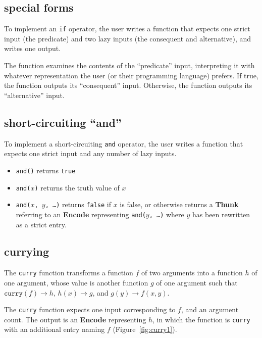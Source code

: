 \documentclass{article}
\newcommand{\encode}{\textbf{Encode}\xspace}
\newcommand{\thunk}{\textbf{Thunk}\xspace}
\newcommand{\bs}{\vspace{\baselineskip}}
\begin{document}
\subsection{special forms} To implement an \texttt{if}
operator, the user writes a function that expects one strict input
(the predicate) and two lazy inputs (the consequent and alternative),
and writes one output.

\bs

The function examines the contents of the ``predicate'' input,
interpreting it with whatever representation the user (or their
programming language) prefers. If true, the function outputs its
``consequent'' input. Otherwise, the function outputs its
``alternative'' input.

\subsection{short-circuiting ``and''} To implement a
short-circuiting \texttt{and} operator, the user writes a function
that expects one strict input and any number of lazy inputs.

\begin{itemize}[itemsep=0pt]
\item \texttt{and()} returns \texttt{true}
\item \texttt{and($x$)} returns the truth value of $x$
\item \texttt{and($x$, $y$, \ldots)} returns \texttt{false} if $x$ is false, or otherwise returns a \thunk referring to an 
\encode representing \texttt{and($y$, \ldots)} where $y$ has been rewritten as a strict entry.
\end{itemize}

\subsection{currying} The \texttt{curry} function transforms
a function $f$ of two arguments into a function $h$ of one argument,
whose value is another function $g$ of one argument such that $\texttt{curry}(f) \rightarrow h$, $h(x) \rightarrow g$, and $g(y) \rightarrow f(x,y)$.

\bs

The \texttt{curry} function expects one input corresponding to $f$,
and an argument count. The output is an \encode representing
$h$, in which the function is \texttt{curry} with an additional entry
naming $f$ (Figure~\ref{fig:curry1}).

\bs
\end{document}
